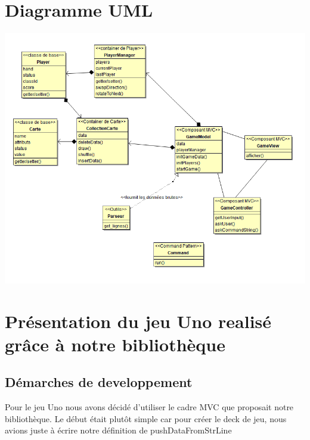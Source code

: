 \documentclass[12pt, letterpaper]{article}
\begin{document}
\section{Diagramme UML}
\includegraphics[width=\linewidth]{Diagramme.PNG}

\section{Présentation du jeu Uno realisé grâce à notre bibliothèque}
\subsection{Démarches de developpement}
Pour le jeu Uno nous avons décidé d’utiliser le cadre MVC que proposait notre bibliothèque.
Le début était plutôt simple car pour créer le deck de jeu, nous avions juste à écrire notre définition de pushDataFromStrLine \\
\end{document}
